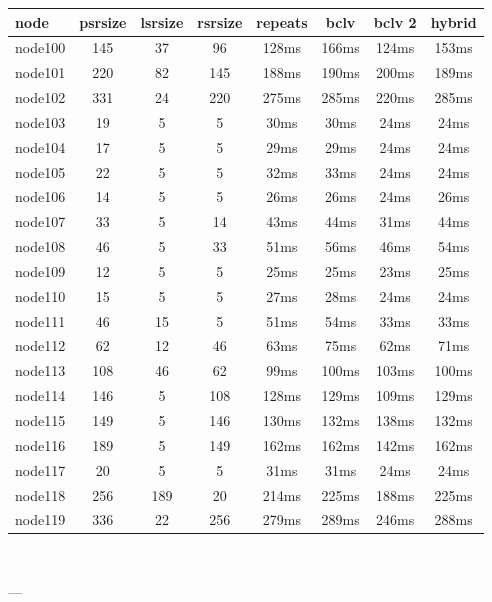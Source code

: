 \begin{tabular}{|l|c|c|c|c|c|c|c|}
\hline node & psrsize & lsrsize & rsrsize   & repeats & bclv & bclv 2 & hybrid\\
    \hline node100 & 145 & 37 & 96 & 128ms & 166ms & 124ms & 153ms\\
    \hline node101 & 220 & 82 & 145 & 188ms & 190ms & 200ms & 189ms\\
    \hline node102 & 331 & 24 & 220 & 275ms & 285ms & 220ms & 285ms\\
    \hline node103 & 19 & 5 & 5 & 30ms & 30ms & 24ms & 24ms\\
    \hline node104 & 17 & 5 & 5 & 29ms & 29ms & 24ms & 24ms\\
    \hline node105 & 22 & 5 & 5 & 32ms & 33ms & 24ms & 24ms\\
    \hline node106 & 14 & 5 & 5 & 26ms & 26ms & 24ms & 26ms\\
    \hline node107 & 33 & 5 & 14 & 43ms & 44ms & 31ms & 44ms\\
    \hline node108 & 46 & 5 & 33 & 51ms & 56ms & 46ms & 54ms\\
    \hline node109 & 12 & 5 & 5 & 25ms & 25ms & 23ms & 25ms\\
    \hline node110 & 15 & 5 & 5 & 27ms & 28ms & 24ms & 24ms\\
    \hline node111 & 46 & 15 & 5 & 51ms & 54ms & 33ms & 33ms\\
    \hline node112 & 62 & 12 & 46 & 63ms & 75ms & 62ms & 71ms\\
    \hline node113 & 108 & 46 & 62 & 99ms & 100ms & 103ms & 100ms\\
    \hline node114 & 146 & 5 & 108 & 128ms & 129ms & 109ms & 129ms\\
    \hline node115 & 149 & 5 & 146 & 130ms & 132ms & 138ms & 132ms\\
    \hline node116 & 189 & 5 & 149 & 162ms & 162ms & 142ms & 162ms\\
    \hline node117 & 20 & 5 & 5 & 31ms & 31ms & 24ms & 24ms\\
    \hline node118 & 256 & 189 & 20 & 214ms & 225ms & 188ms & 225ms\\
    \hline node119 & 336 & 22 & 256 & 279ms & 289ms & 246ms & 288ms\\

\hline
\end{tabular} \

---


